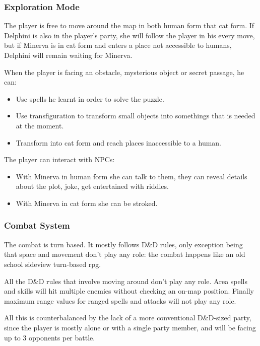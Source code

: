 
\subsubsection{Exploration Mode}

The player is free to move around  the map in both human form that cat form. If Delphini is also in the player's party, she will follow the player in his every move, but if Minerva is in cat form and enters a place not accessible to humans, Delphini will remain waiting for Minerva. 

When the player is facing an obstacle, mysterious object or secret passage, he can: 

\begin{itemize}
    \item Use spells he learnt in order to solve the puzzle.
    \item Use transfiguration to transform small objects into somethings that is needed at the moment.
    \item Transform into cat form and reach places inaccessible to a human.
\end{itemize}

The player can interact with NPCs:

\begin{itemize}
    \item With Minerva in human form she can talk to them, they can reveal details about the plot, joke, get entertained with riddles.
    \item With Minerva in cat form she can be stroked.
\end{itemize}


\pagebreak 

\subsubsection{Combat System}
The combat is turn based. It mostly follows D\&D rules, only exception being that space and movement don't play any role: the combat happens like an old school sideview turn-based rpg. 

All the D\&D rules that involve moving around don't play any role. Area spells and skills will hit multiple enemies without checking an on-map position. Finally maximum range values for ranged spells and attacks will not play any role. 

All this is counterbalanced by the lack of a more conventional D\&D-sized party, since the player is mostly alone or with a single party member, and will be facing up to 3 opponents per battle.

